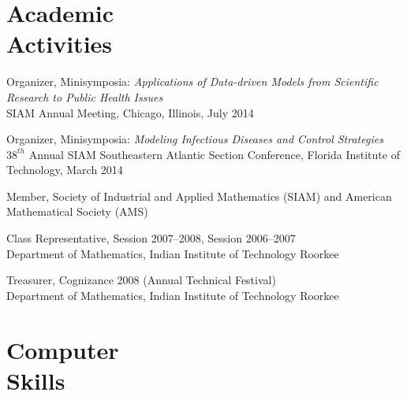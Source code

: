 \documentclass[margin,line,pifont,palatino,courier]{res}
\newenvironment{list1}{
  \begin{list}{\ding{113}}{%
      \setlength{\itemsep}{0in}
      \setlength{\parsep}{0in} \setlength{\parskip}{0in}
      \setlength{\topsep}{0in} \setlength{\partopsep}{0in}
      \setlength{\leftmargin}{0.17in}}}{\end{list}}
\begin{document}
\begin{resume}




\section{\sc Academic \\ Activities}
Organizer, Minisymposia: \textit{Applications of Data-driven Models
  from Scientific Research to Public Health Issues} \\
SIAM Annual Meeting, Chicago, Illinois, July 2014

Organizer, Minisymposia: \textit{Modeling Infectious Diseases and Control Strategies} \\
$38^{th}$ Annual SIAM Southeastern Atlantic Section Conference, Florida Institute of Technology, March 2014

Member, Society of Industrial and Applied Mathematics (SIAM)
and American Mathematical Society (AMS)

Class Representative, Session 2007--2008, Session 2006--2007  \\
Department of Mathematics, Indian Institute of Technology Roorkee

Treasurer, Cognizance 2008 (Annual Technical Festival) \\
Department of Mathematics, Indian Institute of Technology Roorkee

\section{\sc Computer \\ Skills}


\end{resume}
\end{document}
